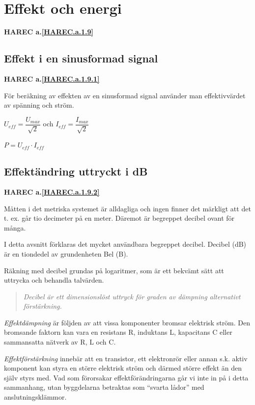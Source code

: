 \section{Effekt och energi}
\textbf{HAREC a.\ref{HAREC.a.1.9}\label{myHAREC.a.1.9}}
\label{effect och energi}

\subsection{Effekt i en sinusformad signal}
\textbf{HAREC a.\ref{HAREC.a.1.9.1}\label{myHAREC.a.1.9.1}}

För beräkning av effekten av en sinusformad signal använder man effektivvärdet
av spänning och ström.

\(U_{eff} = \dfrac{U_{max}}{\sqrt{2}}\) och \(I_{eff} = \dfrac{I_{max}}{\sqrt{2}}\)

\(P = U_{eff} \cdot I_{eff}\)

\subsection{Effektändring uttryckt i dB}
\textbf{HAREC a.\ref{HAREC.a.1.9.2}\label{myHAREC.a.1.9.2}}

Måtten i det metriska systemet är alldagliga och ingen finner det märkligt att
det t. ex. går tio decimeter på en meter. Däremot är begreppet decibel ovant för
många.

I detta avsnitt förklaras det mycket användbara begreppet decibel. Decibel (dB)
är en tiondedel av grundenheten Bel (B).

Räkning med decibel grundas på logaritmer, som är ett bekvämt sätt att uttrycka
och behandla talvärden.

\begin{quote}\emph{
Decibel är ett dimensionslöst uttryck för graden av dämpning alternativt
förstärkning.
}\end{quote}

\emph{Effektdämpning} är följden av att vissa komponenter bromsar elektrisk ström. Den
bromsande faktorn kan vara en resistans R, induktans L, kapacitans C eller
sammansatta nätverk av R, L och C.

\emph{Effektförstärkning} innebär att en transistor, ett elektronrör eller annan s.k.
aktiv komponent kan styra en större elektrisk ström och därmed större effekt än
den själv styrs med. Vad som förorsakar effektförändringarna går vi inte in på i
detta sammanhang, utan byggdelarna betraktas som ``svarta lådor'' med
anslutningsklämmor.

